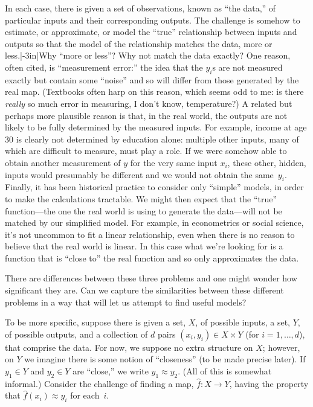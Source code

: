 \documentclass[10pt, a4paper]{article}
\begin{document}
In each case, there is given a set of observations, known as “the
data,” of particular inputs and their corresponding outputs. The
challenge is somehow to estimate, or approximate, or model the “true”
relationship between inputs and outputs so that the model of the
relationship matches the data, more or less.\sidenote|-3in|{Why “more
  or less”? Why not match the data exactly? One reason, often cited,
  is “measurement error:” the idea that the $y_i$s are not measured
  exactly but contain some “noise” and so will differ from those
  generated by the real map. (Textbooks often harp on this
  reason, which seems odd to me: is there \emph{really} so much error
  in measuring, I don't know, temperature?)\sidepar%
  A related but perhaps more plausible reason is that, in the real
  world, the outputs are not likely to be fully determined by the
  measured inputs. For example, income at age 30 is clearly not
  determined by education alone: multiple other inputs, many of which
  are difficult to measure, must play a role. If we were somehow able
  to obtain another measurement of $y$ for the very same input $x_i$,
  these other, hidden, inputs would presumably be different and we
  would not obtain the same~$y_i$.\sidepar%
  Finally, it has been historical practice to consider only “simple”
  models, in order to make the calculations tractable. We might then
  expect that the “true” function---the one the real world is using to
  generate the data---will not be matched by our simplified model. For
  example, in econometrics or social science, it's not uncommon to fit
  a linear relationship, even when there is no reason to believe that
  the real world is linear. In this case what we're looking for is a
  function that is “close to” the real function and so only
  approximates the data.}

There are differences between these three problems and one might
wonder how significant they are. Can we capture the similarities
between these different problems in a way that will let us attempt to
find useful models?

To be more specific, suppose there is given a set, $X$, of possible
inputs, a set, $Y$, of possible outputs, and a collection of $d$ pairs
$(x_i, y_i)\in X\times Y$ (for $i=1,\dots,d$), that comprise the data. For
now, we suppose no extra structure on $X$; however, on $Y$ we imagine
there is some notion of “closeness” (to be made precise later). If
$y_1\in Y$ and $y_2\in Y$ are “close,” we write $y_1 \approx y_2$. (All of this
is somewhat informal.) Consider the challenge of finding a map,
$\hat{f}\colon X\to Y$, having the property that
$\hat{f}(x_i) \approx y_i$ for each~$i$.
\end{document}
